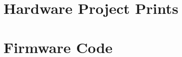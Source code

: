 \begin{apendicesenv}

\partapendices

	\chapter{Hardware Project Prints}\label{ch:first-appendix}

		

	\chapter{Firmware Code}\label{ch:second-appendix}

		

\end{apendicesenv}
